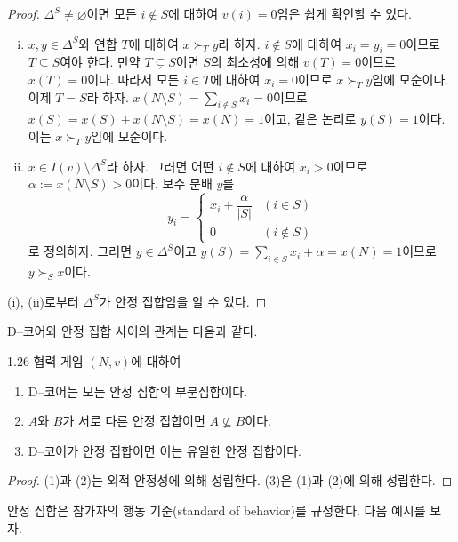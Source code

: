 \documentclass{article}
\numberwithin{equation}{section}
\begin{document}
\begin{proof}
	$\Delta^S\ne\varnothing$이면 모든 $i\notin S$에 대하여 $v(i)=0$임은 쉽게 확인할 수 있다.
	\begin{enumerate}[(i)]
		\item $x,y\in\Delta^S$와 연합 $T$에 대하여 $x\succ_Ty$라 하자. $i\notin S$에 대하여 $x_i=y_i=0$이므로 $T\subseteq S$여야 한다. 만약 $T\subsetneq S$이면 $S$의 최소성에 의해 $v(T)=0$이므로 $x(T)=0$이다. 따라서 모든 $i\in T$에 대하여 $x_i=0$이므로 $x\succ_Ty$임에 모순이다. 이제 $T=S$라 하자. $x(N\setminus S)=\sum_{i\notin S}x_i=0$이므로 $x(S)=x(S)+x(N\setminus S)=x(N)=1$이고, 같은 논리로 $y(S)=1$이다. 이는 $x\succ_Ty$임에 모순이다.
		\item $x\in I(v)\setminus\Delta^S$라 하자. 그러면 어떤 $i\notin S$에 대하여 $x_i>0$이므로 $\alpha:=x(N\setminus S)>0$이다. 보수 분배 $y$를
		\[
			y_i=\begin{cases}
				x_i+\dfrac{\alpha}{\vert S\vert} & (i\in S)\\
				0 & (i\notin S)
			\end{cases}
		\]
		로 정의하자. 그러면 $y\in\Delta^S$이고 $y(S)=\sum_{i\in S}x_i+\alpha=x(N)=1$이므로 $y\succ_Sx$이다.
	\end{enumerate}
	(i), (ii)로부터 $\Delta^S$가 안정 집합임을 알 수 있다.
\end{proof}

D--코어와 안정 집합 사이의 관계는 다음과 같다.

\begin{thm}{}{1.26}
	협력 게임 $(N,v)$에 대하여
	\begin{enumerate}[(1)]
		\item D--코어는 모든 안정 집합의 부분집합이다.
		\item $A$와 $B$가 서로 다른 안정 집합이면 $A\nsubseteq B$이다.
		\item D--코어가 안정 집합이면 이는 유일한 안정 집합이다.
	\end{enumerate}
\end{thm}

\begin{proof}
	(1)과 (2)는 외적 안정성에 의해 성립한다. (3)은 (1)과 (2)에 의해 성립한다.
\end{proof}

\newpage
안정 집합은 참가자의 행동 기준(standard of behavior)를 규정한다. 다음 예시를 보자.
\end{document}
